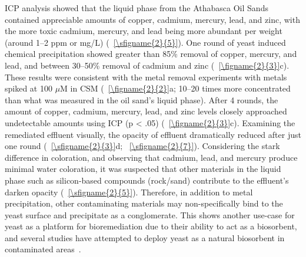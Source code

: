 \documentclass[../main/main]{subfiles}
\begin{document}
ICP analysis showed that the liquid phase from the Athabasca Oil Sands contained appreciable amounts of copper, cadmium, mercury, lead, and zinc, with the more toxic cadmium, mercury, and lead being more abundant per weight (around 1--2 ppm or mg/L) (\sFIGURE~\ref{\sfigname{2}{5}}). One round of yeast induced chemical precipitation showed greater than 85\% removal of copper, mercury, and lead, and between 30--50\% removal of cadmium and zinc (\FIGURE~\ref{\figname{2}{3}}c). These results were consistent with the metal removal experiments with metals spiked at 100 $\mu$M in CSM (\FIGURE~\ref{\figname{2}{2}}a; 10--20 times more concentrated than what was measured in the oil sand's liquid phase).
After 4 rounds, the amount of copper, cadmium, mercury, lead, and zinc levels closely approached undetectable amounts using ICP (p < .05) (\FIGURE~\ref{\figname{2}{3}}c).
Examining the remediated effluent visually, the opacity of effluent dramatically reduced after just one round (\FIGURE~\ref{\sfigname{2}{3}}d; \sFIGURE~\ref{\sfigname{2}{7}}). Considering the stark difference in coloration, and observing that cadmium, lead, and mercury produce minimal water coloration, it was suspected that other materials in the liquid phase such as silicon-based compounds (rock/sand) contribute to the effluent's darken opacity
(\sFIGURE~\ref{\sfigname{2}{5}}). Therefore, in addition to metal precipitation, other contaminating materials may non-specifically bind to the yeast surface and precipitate as a conglomerate. This shows another use-case for yeast as a platform for bioremediation due to their ability to act as a biosorbent, and several studies have attempted to deploy yeast as a natural biosorbent in contaminated areas~\cite{wang2006}.

\end{document}
